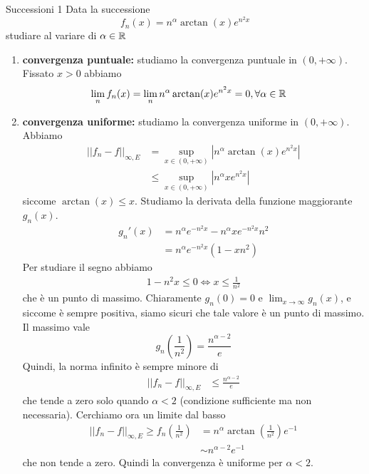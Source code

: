 \documentclass[a4paper]{article}
\begin{document}
\pagebreak

\begin{snippetexercise}{Successioni 1}
    Data la successione
    \[
        f_n(x) = n^\alpha \arctan(x)e^{n^2 x}
    \]
    studiare al variare di \(\alpha\in\mathbb{R}\)
    \begin{enumerate}
        \item \textbf{convergenza puntuale:} studiamo la convergenza puntuale in \((0, +\infty)\).
        Fissato \(x>0\) abbiamo
        \begin{align*}
            \lim_n f_n(x) &= \lim_n n^\alpha \arctan(x)e^{n^2 x} = 0, \forall \alpha \in \mathbb{R}
        \end{align*}
        \item \textbf{convergenza uniforme:} studiamo la convergenza uniforme in \((0, +\infty)\).
        Abbiamo
        \begin{align*}
            {||f_n - f||}_{\infty, E} &= \sup_{x\in (0, +\infty)} \left|
                n^\alpha \arctan(x)e^{n^2 x}
            \right| \\
            &\leq \sup_{x\in (0, +\infty)} \left|
                n^\alpha x e^{n^2 x}
            \right|
        \end{align*}
        siccome \(\arctan(x) \leq x\). Studiamo la derivata della funzione maggiorante \(g_n(x)\).
        \begin{align*}
            g_n'(x) &= n^\alpha e^{-n^2x} - n^\alpha x e^{-n^2 x} n^2 \\
            &= n^\alpha e^{-n^2 x}(1-xn^2)
        \end{align*}
        Per studiare il segno abbiamo
        \begin{align*}
            1 - n^2 x \leq 0 \iff x \leq \frac{1}{n^2}
        \end{align*}
        che è un punto di massimo. Chiaramente \(g_n(0)=0\) e \(\lim_{x\to\infty} g_n(x)\),
        e siccome è sempre positiva, siamo sicuri che tale valore è un punto di massimo.
        Il massimo vale
        \[
            g_n\left(\frac{1}{n^2}\right) = \frac{n^{\alpha-2}}{e}
        \]
        Quindi, la norma infinito è sempre minore di 
        \begin{align*}
            ||f_n-f||_{\infty, E} &\leq \frac{n^{\alpha-2}}{e}
        \end{align*}
        che tende a zero solo quando \(\alpha < 2\) (condizione sufficiente ma non necessaria).
    Cerchiamo ora un limite dal basso
    \begin{align*}
        ||f_n-f||_{\infty, E} \geq f_n\left(\frac{1}{n^2}\right)
        &= n^\alpha \arctan\left(\frac{1}{n^2}\right)e^{-1} \\
        &\sim n^{\alpha - 2}e^{-1}
    \end{align*}
    che non tende a zero. Quindi la convergenza è uniforme per \(\alpha < 2\).
    \end{enumerate}
\end{snippetexercise}
\end{document}
